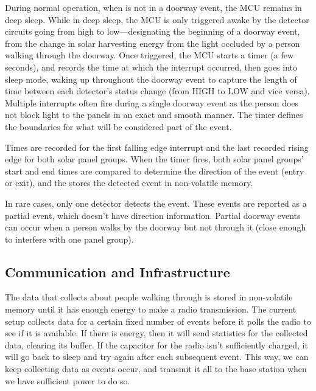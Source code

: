 During normal operation, when \sysname is not in a doorway event, the MCU remains in deep sleep.
While in deep sleep, the MCU is only triggered awake by the detector circuits going from high to low---designating the beginning of a doorway event, from the change in solar harvesting energy from the light occluded by a person walking through the doorway.
Once triggered, the MCU starts a timer (a few seconds), and records the time at which the interrupt occurred, then goes into sleep mode, waking up throughout the doorway event to capture the length of time between each detector's status change (from HIGH to LOW and vice versa).
Multiple interrupts often fire during a single doorway event as the person does not block light to the panels in an exact and smooth manner.
The timer defines the boundaries for what will be considered part of the event.

Times are recorded for the first falling edge interrupt and the last recorded rising edge for both solar panel groups.
When the timer fires, both solar panel groups' start and end times are compared to determine the direction of the event (entry or exit), and the \sysname stores the detected event in non-volatile memory.


In rare cases, only one detector detects the event.
These events are reported as a partial event, which doesn't have direction information.
Partial doorway events can occur when a person walks by the doorway but not through it (close enough to interfere with one panel group).


\subsection{Communication and Infrastructure}
The data that \sysname collects about people walking through is stored in non-volatile memory until it has enough energy to make a radio transmission.
The current setup collects data for a certain fixed number of events before it polls the radio to see if it is available.
If there is energy, then it will send statistics for the collected data, clearing its buffer.
If the capacitor for the radio isn't sufficiently charged, it will go back to sleep and try again after each subsequent event.
This way, we can keep collecting data as events occur, and transmit it all to the base station when we have sufficient power to do so.


